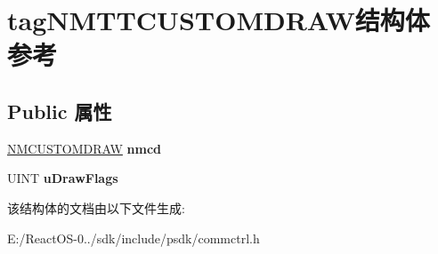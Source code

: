 \hypertarget{structtag_n_m_t_t_c_u_s_t_o_m_d_r_a_w}{}\section{tag\+N\+M\+T\+T\+C\+U\+S\+T\+O\+M\+D\+R\+A\+W结构体 参考}
\label{structtag_n_m_t_t_c_u_s_t_o_m_d_r_a_w}
\subsection*{Public 属性}
\begin{DoxyCompactItemize}
\item 
\mbox{\label{structtag_n_m_t_t_c_u_s_t_o_m_d_r_a_w_a179136dbaabe58d2787461026fb875fb}} 
\hyperlink{structtag_n_m_c_u_s_t_o_m_d_r_a_w_i_n_f_o}{N\+M\+C\+U\+S\+T\+O\+M\+D\+R\+AW} {\bfseries nmcd}
\item 
\mbox{\label{structtag_n_m_t_t_c_u_s_t_o_m_d_r_a_w_a9a2cafcf3ebcd08681d23193fc556825}} 
U\+I\+NT {\bfseries u\+Draw\+Flags}
\end{DoxyCompactItemize}


该结构体的文档由以下文件生成\+:\begin{DoxyCompactItemize}
\item 
E\+:/\+React\+O\+S-\/0../sdk/include/psdk/commctrl.\+h\end{DoxyCompactItemize}
